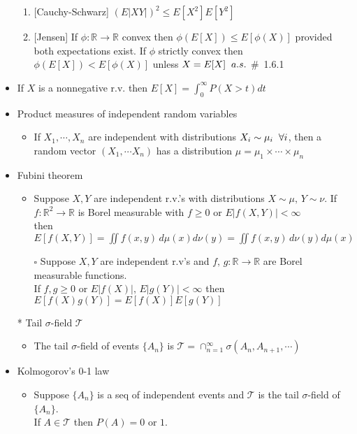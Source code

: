 \documentclass[12pt, A4]{article}
\begin{document}
\begin{itemize}
\begin{enumerate}
    	\item {[Cauchy-Schwarz]} $(E|XY|)^2\leq E[X^2]E[Y^2]$ 
    	\item {[Jensen]} If $\phi : \mathbb{R}\rightarrow \mathbb{R}$ convex then $\phi(E[X])\leq E[\phi(X)]$ provided both expectations exist.
    	If $\phi$ strictly convex then $\phi(E[X])<E[\phi(X)]$ unless $X=E[X]\hspace{0.2cm} a.s.$ \quad \#\ 1.6.1
    \end{enumerate}
    \item If $X$ is a nonnegative r.v. then $E[X]=\int_{0}^{\infty}P(X>t)dt$
    \item Product measures of independent random variables
    \begin{itemize}
    	\item If $X_1, \cdots, X_n$ are independent with distributions $X_i \sim \mu_i \hspace{0.2cm} \forall i$, then a random vector $(X_1, \cdots X_n)$ has a distribution $\mu=\mu_1 \times \cdots \times \mu_n$
    \end{itemize}
	\item Fubini theorem
	\begin{itemize}
		\item Suppose $X, Y$ are independent r.v.'s with distributions $X\sim \mu,\, Y\sim \nu$.
		\newline If $f:\mathbb{R}^2 \rightarrow \mathbb{R}$ is Borel measurable with $f\geq 0$ or $E|f(X,Y)|<\infty$ \\ then $E[f(X,Y)]=\iint f(x,y)\,d\mu(x)d\nu(y)= \iint f(x,y)\, d\nu(y)d\mu(x)$ 
		\item[$\square$] Suppose $X, Y$ are independent r.v's and $f,\, g: \mathbb{R}\rightarrow \mathbb{R}$ are Borel measurable functions.\\ If $f, g\geq 0$ or $E|f(X)|, \, E|g(Y)|<\infty$ then $E[f(X)g(Y)]=E[f(X)]E[g(Y)]$
	\end{itemize}
	\item[*] Tail $\sigma$-field $\mathcal{T}$
	\begin{itemize}
		\item The tail $\sigma$-field of events $\{A_n\}$ is $\mathcal{T}=\cap_{n=1}^\infty \sigma(A_n, A_{n+1},\cdots)$
	\end{itemize}
	\item Kolmogorov's 0-1 law
	\begin{itemize}
		\item Suppose $\{A_n\}$ is a seq of independent events and $\mathcal{T}$ is the tail $\sigma$-field of $\{A_n\}$. \\ If $A\in \mathcal{T}$ then $P(A)=0$ or $1$.

\end{itemize}
\end{itemize}
\end{document}
